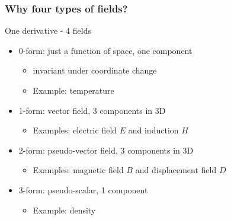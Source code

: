 \documentclass[aspectratio=169]{beamer}
\begin{document}
\begin{frame}[t]
  \frametitle{Why four types of fields?}
    \begin{block}{One derivative - 4 fields }
      \begin{itemize}%
	  \item {\color{red} 0-form}: just a function of space, one component
        \begin{itemize}
          \item invariant under coordinate change
          \item Example: temperature
        \end{itemize}
      \item {\color{red} 1-form}: vector field, 3 components in 3D
        \begin{itemize}
          \item Examples: electric field $E$ and induction $H$
        \end{itemize}
      \item {\color{red} 2-form}: pseudo-vector field, 3 components in 3D
         \begin{itemize}
          \item Examples: magnetic field $B$ and displacement field $D$
        \end{itemize}
   \item {\color{red} 3-form}: pseudo-scalar, 1 component
         \begin{itemize}
          \item Example: density
        \end{itemize}
    \end{itemize}
  \end{block}
\end{frame}
\end{document}
